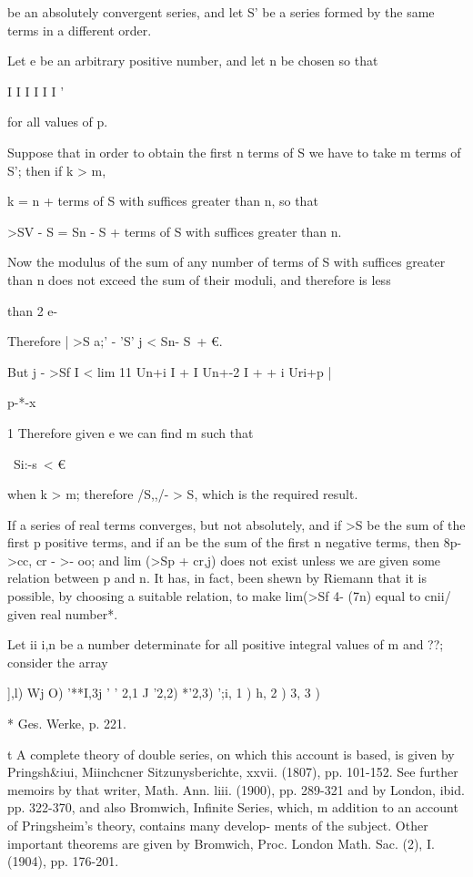 %
%

be an absolutely convergent series, and let S' be a series formed by
the same terms in a different order.

Let e be an arbitrary positive number, and let n be chosen so that

I I I I I I '

for all values of p.

Suppose that in order to obtain the first n terms of S we have to take
m terms of S'; then if k > m,

 k = n + terms of S with suffices greater than n, so that

>SV - S = Sn - S + terms of S with suffices greater than n.

Now the modulus of the sum of any number of terms of S with suffices
greater than n does not exceed the sum of their moduli, and therefore
is less

than 2 e-

Therefore | >S a;' - 'S' j < Sn- S\ + €.

But j - >Sf I < lim 11 Un+i I + I Un+-2 I +    + i Uri+p |

p-*-x

1 Therefore given e we can find m such that

\ Si:-s\ < €

when k > m; therefore /S,,/- > S, which is the required result.

If a series of real terms converges, but not absolutely, and if >S be
the sum of the first p positive terms, and if an be the sum of the
first n negative terms, then 8p->cc, cr - >- oo; and lim (>Sp + cr,j)
does not exist unless we are given some relation between p and n. It
has, in fact, been shewn by Riemann that it is possible, by choosing a
suitable relation, to make lim(>Sf 4- (7n) equal to cnii/ given real
number*.


Let ii i,n be a number determinate for all positive integral values of
m and ??; consider the array

 ],l) Wj O) '**I,3j  ' ' 2,1 J '2,2) *'2,3)   ';i, 1 ) h, 2 ) 3,
3 )

* Ges. Werke, p. 221.

t A complete theory of double series, on which this account is based,
is given by Pringsh\&iui, Miinchcner Sitzunysberichte, xxvii. (1807),
pp. 101-152. See further memoirs by that writer, Math. Ann. liii.
(1900), pp. 289-321 and by London, ibid. pp. 322-370, and also
Bromwich, Infinite Series, which, m addition to an account of
Pringsheim's theory, contains many develop- ments of the subject.
Other important theorems are given by Bromwich, Proc. London Math.
Sac. (2), I. (1904), pp. 176-201.

